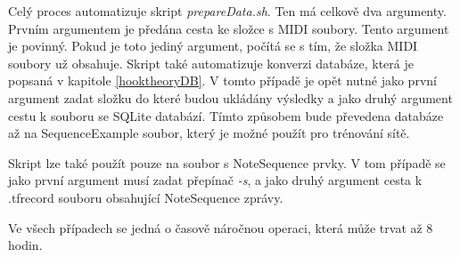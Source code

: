 Celý proces automatizuje skript \emph{prepareData.sh}.
Ten má celkově dva argumenty.
Prvním argumentem je předána cesta ke složce s MIDI soubory.
Tento argument je povinný.
Pokud je toto jediný argument, počítá se s tím,
že složka MIDI soubory už obsahuje.
Skript také automatizuje konverzi databáze, která je popsaná v kapitole \ref{hooktheoryDB}.
V tomto případě je opět nutné jako první argument zadat 
složku do které budou ukládány výsledky
a jako druhý argument cestu k souboru se SQLite databází.
Tímto způsobem bude převedena databáze až na SequenceExample soubor,
který je možné použít pro trénování sítě.
\par

Skript lze také použít pouze na soubor s NoteSequence prvky.
V tom případě se jako první argument musí zadat přepínač \emph{-s},
a jako druhý argument cesta k .tfrecord souboru obsahující NoteSequence zprávy.
\par

Ve všech případech se jedná o časově náročnou operaci, která může trvat až 8 hodin.

